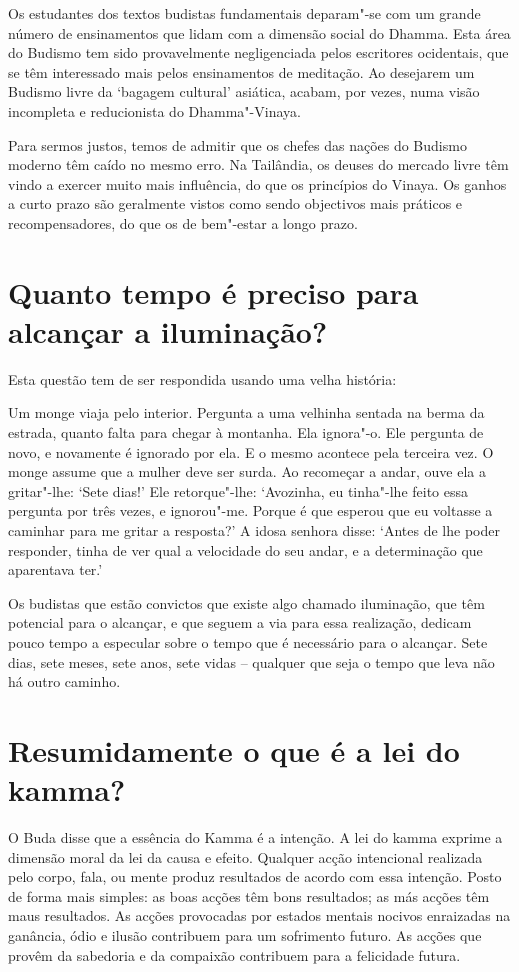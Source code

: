 Os estudantes dos textos budistas fundamentais deparam"-se com um grande
número de ensinamentos que lidam com a dimensão social do Dhamma. Esta
área do Budismo tem sido provavelmente negligenciada pelos escritores
ocidentais, que se têm interessado mais pelos ensinamentos de meditação.
Ao desejarem um Budismo livre da `bagagem cultural' asiática, acabam,
por vezes, numa visão incompleta e reducionista do Dhamma"-Vinaya.

Para sermos justos, temos de admitir que os chefes das nações do Budismo
moderno têm caído no mesmo erro. Na Tailândia, os deuses do mercado
livre têm vindo a exercer muito mais influência, do que os princípios do
Vinaya. Os ganhos a curto prazo são geralmente vistos como sendo
objectivos mais práticos e recompensadores, do que os de bem"-estar a
longo prazo.

\section{Quanto tempo é preciso para alcançar a iluminação?}

Esta questão tem de ser respondida usando uma velha história:

Um monge viaja pelo interior. Pergunta a uma velhinha sentada na berma
da estrada, quanto falta para chegar à montanha. Ela ignora"-o. Ele
pergunta de novo, e novamente é ignorado por ela. E o mesmo acontece
pela terceira vez. O monge assume que a mulher deve ser surda. Ao
recomeçar a andar, ouve ela a gritar"-lhe: `Sete dias!' Ele
retorque"-lhe: `Avozinha, eu tinha"-lhe feito essa pergunta por três
vezes, e ignorou"-me. Porque é que esperou que eu voltasse a caminhar
para me gritar a resposta?' A idosa senhora disse: `Antes de lhe
poder responder, tinha de ver qual a velocidade do seu andar, e a
determinação que aparentava ter.'

Os budistas que estão convictos que existe algo chamado iluminação, que
têm potencial para o alcançar, e que seguem a via para essa realização,
dedicam pouco tempo a especular sobre o tempo que é necessário para o
alcançar. Sete dias, sete meses, sete anos, sete vidas -- qualquer que
seja o tempo que leva não há outro caminho.

\section{Resumidamente o que é a lei do kamma?}

O Buda disse que a essência do Kamma é a intenção. A lei do kamma
exprime a dimensão moral da lei da causa e efeito. Qualquer acção
intencional realizada pelo corpo, fala, ou mente produz resultados de
acordo com essa intenção. Posto de forma mais simples: as boas acções
têm bons resultados; as más acções têm maus resultados. As acções
provocadas por estados mentais nocivos enraizadas na ganância, ódio e
ilusão contribuem para um sofrimento futuro. As acções que provêm da
sabedoria e da compaixão contribuem para a felicidade futura.

